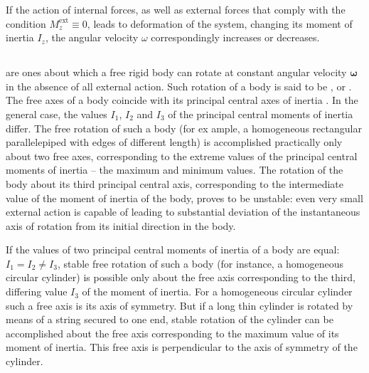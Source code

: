 If the action of internal forces, as well as external forces that comply with the condition $M^{\textrm{ext}}_{z}\equiv 0$, leads to deformation of the system, changing its moment of inertia $I_{z}$, the angular velocity $\omega$ correspondingly increases or decreases.

\subsection{}\label{4.4.4}  are ones about which a free rigid body  can rotate at constant angular velocity $\pmb{\omega}$ in the absence of all external action. Such rotation of a body is said to be , or . The free axes of a body coincide with its
principal central axes of inertia . In the general case, the values $I_{1}$, $I_{2}$ and $I_{3}$ of the principal central moments of inertia  differ. The free rotation of such a body (for ex­ ample, a homogeneous rectangular parallelepiped with edges of different length) is accomplished practically only about two free axes, corresponding to the extreme values of the principal central moments of inertia -- the maximum and minimum val­ues. The rotation of the body about its third principal central axis, corresponding to the intermediate value of the moment of inertia of the body, proves to be unstable: even very small external action is capable of leading to substantial deviation of the instantaneous axis of rotation from its initial direction in the body.

If the values of two principal central moments of inertia of a body are equal: $I_{1} = I_{2} \neq I_{3} $, stable free rotation of such a body (for instance, a homogeneous circular cylinder) is possi­ble only about the free axis corresponding to the third, differing value $I_{3}$ of the moment of inertia. For a homogeneous circular cylinder such a free axis is its axis of symmetry. But if a long thin cylinder is rotated by means of a string secured to one end, stable rotation of the cylinder can be accomplished about the free axis corresponding to the maximum value of its moment of inertia. This free axis is perpendicular to the axis of symmetry
of the cylinder.



